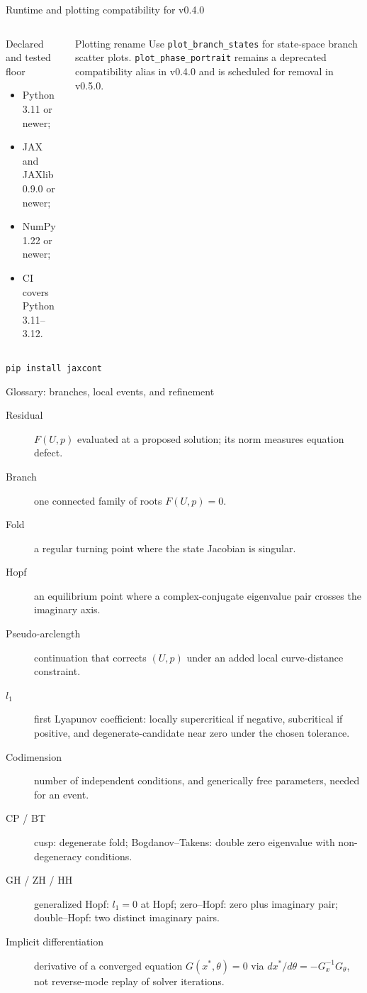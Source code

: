 \begin{frame}{Runtime and plotting compatibility for v0.4.0}
\small
\begin{columns}[T,onlytextwidth]
\begin{block}{Declared and tested floor}
\begin{itemize}
  \item Python 3.11 or newer;
  \item JAX and JAXlib 0.9.0 or newer;
  \item NumPy 1.22 or newer;
  \item CI covers Python 3.11--3.12.
\end{itemize}
\end{block}
\begin{block}{Plotting rename}
Use \texttt{plot\_branch\_states} for state-space branch scatter plots.
\texttt{plot\_phase\_portrait} remains a deprecated compatibility alias in
v0.4.0 and is scheduled for removal in v0.5.0.
\end{block}
\end{columns}
\vfill
\centering
\texttt{pip install jaxcont}
\end{frame}

\begin{frame}{Glossary: branches, local events, and refinement}
\scriptsize
\begin{description}
  \item[Residual] $F(U,p)$ evaluated at a proposed solution; its norm measures equation defect.
  \item[Branch] one connected family of roots $F(U,p)=0$.
  \item[Fold] a regular turning point where the state Jacobian is singular.
  \item[Hopf] an equilibrium point where a complex-conjugate eigenvalue pair crosses the imaginary axis.
  \item[Pseudo-arclength] continuation that corrects $(U,p)$ under an added local curve-distance constraint.
  \item[$l_1$] first Lyapunov coefficient: locally supercritical if negative,
        subcritical if positive, and degenerate-candidate near zero under the chosen tolerance.
  \item[Codimension] number of independent conditions, and generically free parameters, needed for an event.
  \item[CP / BT] cusp: degenerate fold; Bogdanov--Takens: double zero eigenvalue with non-degeneracy conditions.
  \item[GH / ZH / HH] generalized Hopf: $l_1=0$ at Hopf; zero--Hopf: zero plus imaginary pair;
        double--Hopf: two distinct imaginary pairs.
  \item[Implicit differentiation] derivative of a converged equation $G(x^*,\theta)=0$ via
        $dx^*/d\theta=-G_x^{-1}G_\theta$, not reverse-mode replay of solver iterations.
\end{description}
\end{frame}

